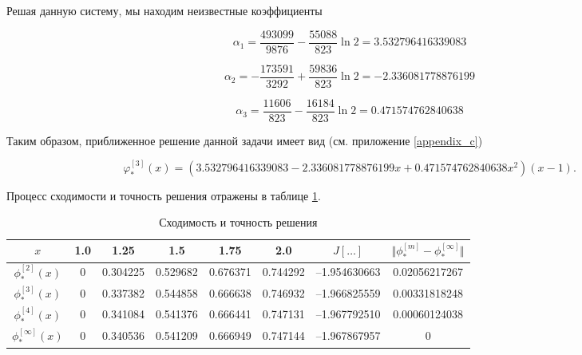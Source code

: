 \documentclass{article}
\begin{document}
\noindent Решая данную систему, мы находим неизвестные коэффициенты

\begin{displaymath}
	\alpha_{1} = \frac{493099}{9876} - \frac{55088}{823}\ln{2} = 3.532796416339083
\end{displaymath}

\begin{displaymath}
	\alpha_{2} = -\frac{173591}{3292} + \frac{59836}{823}\ln{2} = -2.336081778876199
\end{displaymath}

\begin{displaymath}
	\alpha_{3} = \frac{11606}{823} - \frac{16184}{823}\ln{2} = 0.471574762840638
\end{displaymath}

\noindent Таким образом, приближенное решение данной задачи имеет вид (см. приложение \ref{appendix_c})

\begin{displaymath}
	\varphi_{\ast}^{[3]}(x) = (3.532796416339083 - 2.336081778876199x + 0.471574762840638 x^2)(x-1).
\end{displaymath}

Процесс сходимости и точность решения отражены в таблице \ref{table_process_of_convergence_rank_3}.

\begin{table}[!h]
\centering
\begin{tabular}{|c|c|c|c|c|c|c|c|}
	\hline
	$x$ & 1.0 & 1.25 & 1.5 & 1.75 & 2.0 & $J[\ldots]$ & $\Vert \phi_{\ast}^{[m]} - \phi_{\ast}^{[\infty]} \Vert$ \\
	\hline \hline

	$\phi_{\ast}^{[2]}(x)$ & 0 & 0.304225 & 0.529682 & 0.676371 & 0.744292 & –1.954630663 & 0.02056217267 \\	\hline
	$\phi_{\ast}^{[3]}(x)$ & 0 & 0.337382 & 0.544858 & 0.666638 & 0.746932 & –1.966825559 & 0.00331818248 \\	\hline
	$\phi_{\ast}^{[4]}(x)$ & 
0 & 0.341084 & 0.541376 & 0.666441 & 0.747131 & –1.967792510 & 0.00060124038 \\	\hline
	$\phi_{\ast}^{[\infty]}(x)$ & 0 & 0.340536 & 0.541209 & 0.666949 & 0.747144 & –1.967867957 & 0 \\	\hline

\end{tabular}
\caption{Сходимость и точность решения}
\label{table_process_of_convergence_rank_3}
\end{table}
\end{document}
